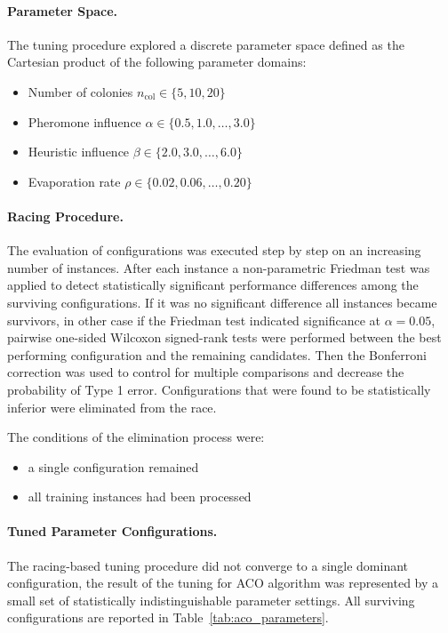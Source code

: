 \documentclass[12pt]{article}
\begin{document}
\paragraph{Parameter Space.}
The tuning procedure explored a discrete parameter space defined as the Cartesian product of the following parameter domains:
\begin{itemize}
    \item Number of colonies $n_{\text{col}} \in \{5, 10, 20\}$
    \item Pheromone influence $\alpha \in \{0.5, 1.0, \dots, 3.0\}$
    \item Heuristic influence $\beta \in \{2.0, 3.0, \dots, 6.0\}$
    \item Evaporation rate $\rho \in \{0.02, 0.06, \dots, 0.20\}$
\end{itemize}

\paragraph{Racing Procedure.}
The evaluation of configurations was executed step by step on an increasing number of instances. After each instance a non-parametric Friedman test was applied to detect statistically significant performance differences among the surviving configurations. If it was no significant difference all instances became survivors, in other case if the Friedman test indicated significance at $\alpha = 0.05$, pairwise
one-sided Wilcoxon signed-rank tests were performed between the best performing configuration and the remaining candidates.
Then the Bonferroni correction was used to control for multiple comparisons and decrease the probability of Type 1 error.
Configurations that were found to be statistically inferior were eliminated from the race.

The conditions of the elimination process were:

\begin{itemize}
    \item a single configuration remained
    \item all training instances had been processed
\end{itemize}


\paragraph{Tuned Parameter Configurations.}
The racing-based tuning procedure did not converge to a single dominant configuration, the result of the tuning for ACO algorithm was represented by a small set of statistically indistinguishable parameter settings.
All surviving configurations are reported in Table~\ref{tab:aco_parameters}.
\end{document}
